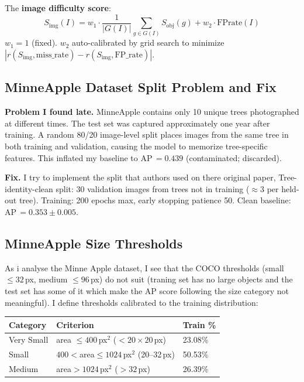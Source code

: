 \documentclass[10pt, a4paper]{article}
\begin{document}
The \textbf{image difficulty score}:
\begin{equation}
  S_{\text{img}}(I) = w_1 \cdot \frac{1}{|G(I)|}
    \sum_{g \in G(I)} S_{\text{obj}}(g)
    + w_2 \cdot \text{FPrate}(I)
\end{equation}
$w_1=1$ (fixed). $w_2$ auto-calibrated by grid search to minimize
$|r(S_{\text{img}},\text{miss\_rate}) - r(S_{\text{img}},\text{FP\_rate})|$.

\subsection{MinneApple Dataset Split Problem and Fix}

\textbf{Problem I found late.}
MinneApple contains only 10 unique trees photographed at different times.
The test set was captured approximately one year after training.
A random 80/20 image-level split places images from the same tree in
both training and validation, causing the model to memorize tree-specific
features.
This inflated my baseline to AP\,$=0.439$ (contaminated; discarded).

\textbf{Fix.}
I try to implement the split that authors used on there original paper,
Tree-identity-clean split: 30 validation images from trees not in
training ($\approx$3 per held-out tree).
Training: 200 epochs max, early stopping patience 50.
Clean baseline: AP\,$=0.353 \pm 0.005$.


\subsection{MinneApple Size Thresholds}
As i analyse the Minne Apple dataset,
I see that the COCO thresholds (small $\leq32$\,px, medium $\leq96$\,px) do not suit
(traning set has no large objects and the test set has some of it which make the 
AP score following the size category not meaningful).
I define thresholds calibrated to the training distribution:

\begin{center}
\small
\begin{tabular}{lll}
\toprule
\textbf{Category} & \textbf{Criterion} & \textbf{Train \%} \\
\midrule
Very Small & area $\leq400$\,px$^2$ ($<20{\times}20$\,px) & 23.08\% \\
Small      & $400<$area$\leq1024$\,px$^2$ (20--32\,px)    & 50.53\% \\
Medium     & area$>1024$\,px$^2$ ($>32$\,px)              & 26.39\% \\
\bottomrule
\end{tabular}
\end{center}
\end{document}
